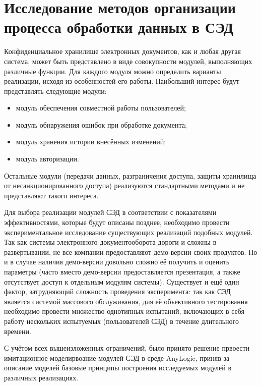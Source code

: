 \section{Исследование методов организации процесса обработки данных в СЭД} \label{experiment}

Конфиденциальное хранилище электронных документов, как и любая другая система, может быть представлено в виде совокупности модулей, выполняющих различные функции. %
Для каждого модуля можно определить варианты реализации, исходя из особенностей его работы. Наибольший интерес будут представлять следующие модули:
\begin{itemize}
	\item модуль обеспечения совместной работы пользователей;
	\item модуль обнаружения ошибок при обработке документа;
	\item модуль хранения истории внесённых изменений;
	\item модуль авторизации.
\end{itemize}
Остальные модули (передачи данных, разграничения доступа, защиты хранилища от несанкционированного доступа) реализуются стандартными методами и не представляют такого интереса.

\vspace{\baselineskip}
Для выбора реализации модулей СЭД в соответствии с показателями эффективностями, которые будут описаны позднее, необходимо провести экспериментальное исследование существующих реализаций подобных модулей. Так как системы электронного документооборота дороги и сложны в развёртывании, не все компании предоставляют демо-версии своих продуктов. Но и в случае наличия демо-версии довольно сложно её получить и оценить параметры (часто вместо демо-версии предоставляется презентация, а также отсутствует доступ к отдельным модулям системы). Существует и ещё один фактор, затрудняющий сложность проведения эксперимента: так как СЭД является системой массового обслуживания, для её объективного тестирования необходимо провести множество однотипных испытаний, включающих в себя работу нескольких испытуемых (пользователей СЭД) в течение длительного времени.

\vspace{\baselineskip}
С учётом всех вышеизложенных ограничений, было принято решение првоести имитационное моделирвоание модулей СЭД в среде AnyLogic, приняв за описание моделей базовые принципы построения исследуемых модулей в различных реализациях.

